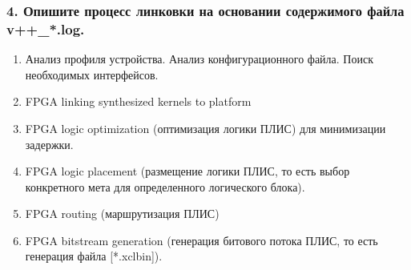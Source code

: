 \subsubsection*{4. Опишите процесс линковки на основании содержимого файла v++\_*.log.}

\begin{enumerate}
	\item Анализ профиля устройства. Анализ конфигурационного файла. Поиск необходимых интерфейсов.
	\item FPGA linking synthesized kernels to platform
	\item FPGA logic optimization (оптимизация логики ПЛИС) для минимизации задержки.
	\item FPGA logic placement (размещение логики ПЛИС, то есть выбор конкретного мета для определенного логического блока). 
	\item FPGA routing (маршрутизация ПЛИС)
	\item FPGA bitstream generation (генерация битового потока ПЛИС, то есть генерация файла  [*.xclbin]).
\end{enumerate}